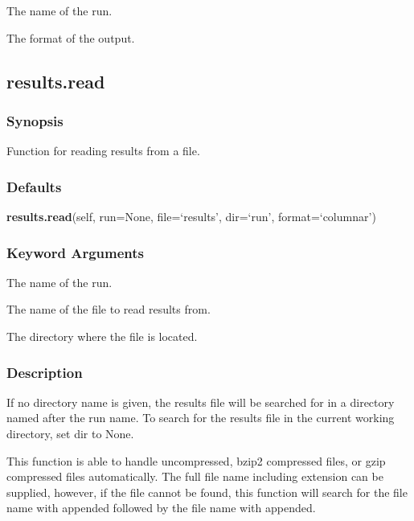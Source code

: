    The name of the run.   

   The format of the output.  

  

  

 \newpage 

 \subsection{results.read} 

  
 \subsubsection{Synopsis} 

 Function for reading results from a file. 
  

  
 \subsubsection{Defaults} 

 \textsf{\textbf{results.read}(self, run=None, file=`results', dir=`run', format=`columnar')} 

  
 \subsubsection{Keyword Arguments} 

   The name of the run.   

   The name of the file to read results from.   

   The directory where the file is located.  

  

  
 \subsubsection{Description} 

 If no directory name is given, the results file will be searched for in a directory named after the run name.  To search for the results file in the current working directory, set dir to None. 
  

 This function is able to handle uncompressed, bzip2 compressed files, or gzip compressed files automatically.  The full file name including extension can be supplied, however, if the file cannot be found, this function will search for the file name with  appended followed by the file name with  appended. 
  

